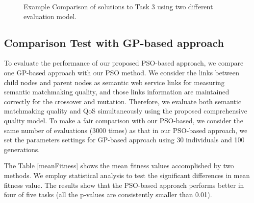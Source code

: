 \documentclass{llncs}
\begin{document}
\begin{figure}[h]
 \caption{Example Comparison of solutions to Task 3 using two different evaluation model.}
 \label{comparisontest}
\end{figure}

\subsection{Comparison Test with GP-based approach}\label{comparisonTestWithGP}
To evaluate the performance of our proposed PSO-based approach, we compare one GP-based approach  \cite{ma2015hybrid} with our PSO method. We consider the links between child nodes and parent nodes as semantic web service links for measuring  semantic matchmaking quality, and those links information are maintained correctly for the crossover and mutation. Therefore, we evaluate both semantic matchmaking quality and QoS simultaneously using the proposed comprehensive quality model. To make a fair comparison with our PSO-based, we consider the same number of evaluations (3000 times) as that in our PSO-based approach, we set the parameters settings for GP-based approach \cite{ma2015hybrid} using 30 individuals and 100 generations.

The Table \ref{meanFitness} shows the mean fitness values accomplished by two methods. We employ statistical analysis to test the significant differences in mean fitness value. The results show that the PSO-based approach performs better in four of five tasks (all the p-values are consistently smaller than 0.01).
\end{document}
